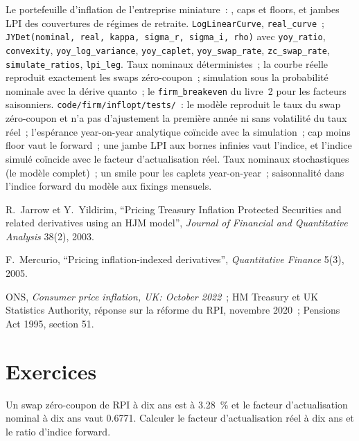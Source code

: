 \begin{build}
 Le portefeuille d'inflation de l'entreprise miniature~: , caps et floors, et jambes LPI des couvertures de régimes de retraite.
 \texttt{LogLinearCurve}, \texttt{real\_curve}~;
\texttt{JYDet(nominal, real, kappa, sigma\_r, sigma\_i, rho)} avec \texttt{yoy\_ratio},
\texttt{convexity}, \texttt{yoy\_log\_variance}, \texttt{yoy\_caplet},
\texttt{yoy\_swap\_rate}, \texttt{zc\_swap\_rate}, \texttt{simulate\_ratios},
\texttt{lpi\_leg}.
 Taux nominaux déterministes~; la courbe réelle reproduit exactement les
swaps zéro-coupon~; simulation sous la probabilité nominale avec la dérive quanto~; le
\texttt{firm\_breakeven} du livre~2 pour les facteurs saisonniers.
 \texttt{code/firm/inflopt/tests/}~: le modèle reproduit le taux du
swap zéro-coupon et n'a pas d'ajustement la première année ni sans volatilité du taux réel~;
l'espérance year-on-year analytique coïncide avec la simulation~; cap moins floor vaut le
forward~; une jambe LPI aux bornes infinies vaut l'indice, et l'indice simulé coïncide avec
le facteur d'actualisation réel.
 Taux nominaux stochastiques (le modèle complet)~; un smile pour
les caplets year-on-year~; saisonnalité dans l'indice forward du modèle aux fixings mensuels.
\end{build}

\begin{omsources}
\item R.\ Jarrow et Y.\ Yildirim, ``Pricing Treasury Inflation Protected Securities
and related derivatives using an HJM model'', \emph{Journal of Financial and
Quantitative Analysis} 38(2), 2003.
\item F.\ Mercurio, ``Pricing inflation-indexed derivatives'', \emph{Quantitative
Finance} 5(3), 2005.
\item ONS, \emph{Consumer price inflation, UK: October 2022}~; HM Treasury et UK
Statistics Authority, réponse sur la réforme du RPI, novembre 2020~; Pensions Act 1995,
section 51.
\end{omsources}

\section{Exercices}

\begin{exercise}[$\star$]\label{exo:rc:inflation-derivatives:1}
Un swap zéro-coupon de RPI à dix ans est à 3.28~\% et le facteur d'actualisation nominal à dix ans
vaut 0.6771. Calculer le facteur d'actualisation réel à dix ans et le ratio d'indice forward.
\end{exercise}

